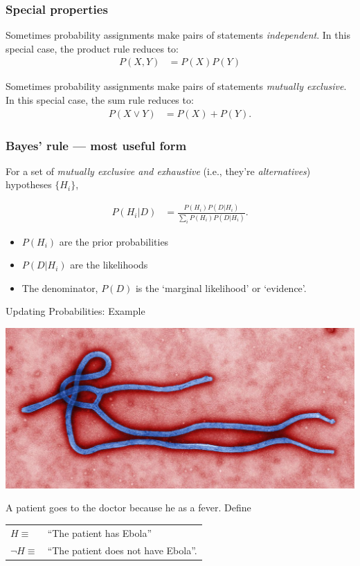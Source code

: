 \documentclass{beamer}
\begin{document}
\begin{frame}
\frametitle{Special properties}
Sometimes probability assignments make pairs of statements
{\em independent}. In this special case, the product rule reduces to:
\begin{align}
P(X,Y) &= P(X)P(Y)
\end{align}

Sometimes probability assignments make pairs of statements
{\em mutually exclusive}. In this special case, the sum rule reduces to:
\begin{align}
P(X \vee Y) &= P(X) + P(Y).
\end{align}

\end{frame}

\begin{frame}
\frametitle{Bayes' rule --- most useful form}
For a set of {\em mutually exclusive and exhaustive} (i.e., they're
{\em alternatives}) hypotheses $\{H_i\}$,

\begin{align}
P(H_i|D) &= \frac{P(H_i)P(D|H_i)}{\sum_i P(H_i)P(D|H_i)}.
\end{align}

\begin{itemize}
\item $P(H_i)$ are the prior probabilities
\item $P(D|H_i)$ are the likelihoods
\item The denominator, $P(D)$ is the `marginal likelihood' or `evidence'.
\end{itemize}

\end{frame}




\begin{frame}[t]{Updating Probabilities: Example}
\begin{center}
\includegraphics[scale=0.5]{ebola.jpg}
\end{center}
A patient goes to the doctor because he as a fever. Define
\begin{center}
\begin{tabular}{ll}
$H \equiv $ & ``The patient has Ebola''\\
$\neg H \equiv $ & ``The patient does not have Ebola''.
\end{tabular}
\end{center}

\end{frame}
\end{document}
